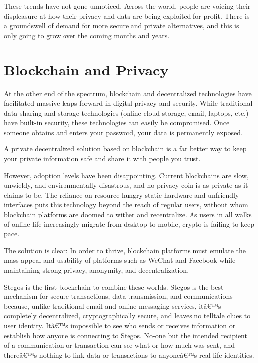 \documentclass[8pt,fleqn,openany]{book}
\begin{document}
These trends have not gone unnoticed. Across the world, people are voicing their displeasure at how their privacy and data are being exploited for profit. There is a groundswell of demand for more secure and private alternatives, and this is only going to grow over the coming months and years.

\section{Blockchain and Privacy}
At the other end of the spectrum, blockchain and decentralized technologies have facilitated massive leaps forward in digital privacy and security. While traditional data sharing and storage technologies (online cloud storage, email, laptops, etc.) have built-in security, these technologies can easily be compromised. Once someone obtains and enters your password, your data is permanently exposed.

A private decentralized solution based on blockchain is a far better way to keep your private information safe and share it with people you trust.

However, adoption levels have been disappointing. Current blockchains are slow, unwieldy, and environmentally disastrous, and no privacy coin is as private as it claims to be. The reliance on resource-hungry static hardware and unfriendly interfaces puts this technology beyond the reach of regular users, without whom blockchain platforms are doomed to wither and recentralize. As users in all walks of online life increasingly migrate from desktop to mobile, crypto is failing to keep pace. 

The solution is clear: In order to thrive, blockchain platforms must emulate the mass appeal and usability of platforms such as WeChat and Facebook while maintaining strong privacy, anonymity, and decentralization.

Stegos is the first blockchain to combine these worlds. Stegos is the best mechanism for secure transactions, data transmission, and communications because, unlike traditional email and online messaging services, itâ€™s completely decentralized, cryptographically secure, and leaves no telltale clues to user identity. Itâ€™s impossible to see who sends or receives information or establish how anyone is connecting to Stegos. No-one but the intended recipient of a communication or transaction can see what or how much was sent, and thereâ€™s nothing to link data or transactions to anyoneâ€™s real-life identities.
\end{document}

